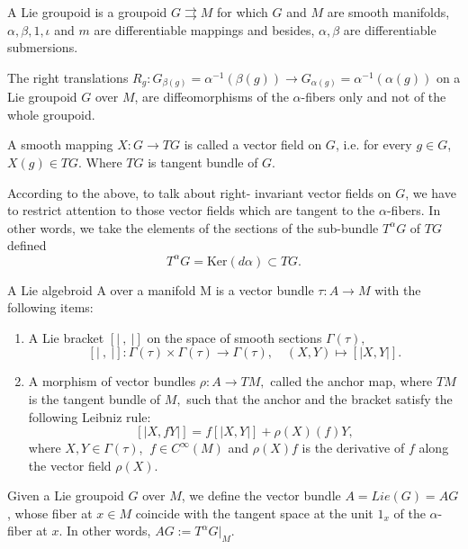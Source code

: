 \documentclass{article}
\begin{document}
A Lie groupoid is a groupoid $G \rightrightarrows M$ for which $G$ and $M$ are smooth manifolds, $\alpha, \beta, 1, \iota$ and $m$ are differentiable mappings and besides, $\alpha,\beta$ are differentiable submersions.

The right translations $R_g: G_{\beta(g)}=\alpha^{-1}(\beta(g))\to G_{\alpha(g)}=\alpha^{-1}(\alpha(g))$ on a Lie groupoid $G$ over $M$, are diffeomorphisms of the $\alpha$-fibers only and not of the whole groupoid. 

A smooth mapping $X: G\to TG$ is called a vector field on $G$, i.e. for every $g\in G$, $X(g)\in TG$. Where $TG$ is tangent bundle of $G$.

According to the above, to talk about right- invariant vector fields on $G$, we have to restrict attention to those vector fields which are tangent to the $\alpha$-fibers. 
In other words, we take the elements of the sections of the sub-bundle $T^\alpha G$ of $TG$ defined $$T^\alpha G=\mathrm{Ker}(d\alpha)\subset TG.$$

A Lie algebroid A over a manifold M is a vector bundle  $\tau : A \longrightarrow M$ with the following items:
\begin{enumerate}
\item A Lie bracket $[\vert ~,~ \vert] $ on the space of smooth sections $ \Gamma( \tau),$
$$[\vert ~,~ \vert]: \Gamma (\tau) \times \Gamma (\tau) \longrightarrow \Gamma (\tau), \quad (X , Y ) \longmapsto [\vert X , Y \vert].$$
\item A morphism of vector bundles $\rho : A \longrightarrow TM,$ called the anchor map, where $TM$ is the tangent bundle of $M,$
such that the anchor and the bracket satisfy the following Leibniz rule:
$$[\vert X , f Y \vert] = f [\vert X , Y \vert] + \rho (X) (f) Y,$$
where $X , Y \in \Gamma (\tau)$, $~f \in C^{\infty} (M)$ and $\rho (X) f$ is the derivative of $f$  along the vector field $\rho (X).$
\end{enumerate}
Given a Lie groupoid $G$ over $M$, we define the vector bundle $A=Lie(G)=AG$, whose fiber at $x\in M$ coincide with the tangent space at the unit $1_x$ of the $\alpha$- fiber at $x$. In other words, $AG:=T^\alpha G|_M$.
\end{document}
